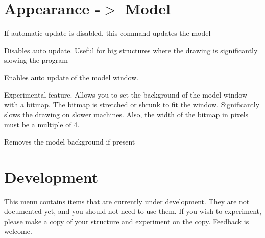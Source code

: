 \documentclass[10pt,a4paper]{report}
\begin{document}
\section{Appearance -$>$ Model}
\label{model} 


\bigskip{}




If automatic update is disabled, this command updates the model




\bigskip{}




Disables auto update. Useful for big structures where the drawing is
significantly slowing the program




\bigskip{}




Enables auto update of the model window.




\bigskip{}




Experimental feature. Allows you to set the background of the model
window with a bitmap. The bitmap is stretched or shrunk to fit the window.
Significantly slows the drawing on slower machines. Also, the width of
the bitmap in pixels must be a multiple of 4.




\bigskip{}




Removes the model background if present




\section{Development}



This menu contains items that are currently under development. They
are not documented yet, and you should not need to use them. If you
wish to experiment, please make a copy of your structure and experiment
on the copy. Feedback is welcome.

\printindex
\end{document}
